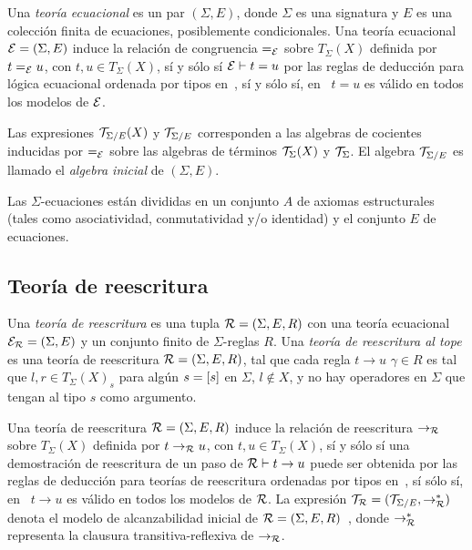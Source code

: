  Una {\em teoría ecuacional} es un par $(\Sigma, E)$, donde $\Sigma$ es
 una signatura y $E$ es una colección finita de ecuaciones, posiblemente
 condicionales.
 Una teoría ecuacional $\mathcal{E}=(\Sigma, E)$ induce la relación de
 congruencia $=_{\mathcal{E}}$ sobre $T_\Sigma(X)$ definida por $t =_{\mathcal{E}} u$, 
 con $t, u \in T_\Sigma(X)$, sí y sólo sí $\mathcal{E} \vdash t=u$ por las
 reglas de deducción para lógica ecuacional ordenada por tipos
 en~\cite{meseguer97}, sí y sólo sí, en~\cite{meseguer97} $t=u$ es válido
 en todos los modelos de $\mathcal{E}$.

 Las expresiones $\mathcal{T}_{\Sigma/E}(X)$ y $\mathcal{T}_{\Sigma/E}$ corresponden
 a las algebras de cocientes inducidas por $=_{\mathcal{E}}$ sobre las algebras de
 términos $\mathcal{T}_\Sigma(X)$ y $\mathcal{T}_\Sigma$.
 El algebra $\mathcal{T}_{\Sigma/E}$ es llamado el {\em algebra inicial} de
 $(\Sigma, E)$.
 
 Las $\Sigma$-ecuaciones están divididas en un conjunto $A$ de axiomas
 estructurales (tales como asociatividad, conmutatividad y/o identidad)
 y el conjunto $E$ de ecuaciones.

 \subsection{Teoría de reescritura}
 \label{tr.prelim}
 
 Una {\em teoría de reescritura} es una tupla $\mathcal{R} = (\Sigma, E, R)$
 con una teoría ecuacional $\mathcal{E}_{\mathcal{R}} = (\Sigma, E)$ y un conjunto
 finito de $\Sigma$-reglas $R$. Una {\em teoría de reescritura al tope}
 es una teoría de reescritura $\mathcal{R} = (\Sigma, E, R)$, tal que cada regla
 $t \rightarrow u$  $\gamma \in R$ es tal que $l, r \in T_{\Sigma}(X)_s$
 para algún $s = [s]$ en $\Sigma$, $l \notin X$, y no hay operadores
 en $\Sigma$ que tengan al tipo $s$ como argumento.

 Una teoría de reescritura $\mathcal{R}=(\Sigma, E, R)$ induce la relación de
 reescritura $\rightarrow_{\mathcal{R}}$ sobre $T_\Sigma(X)$ definida por $t\rightarrow_{\mathcal{R}}u$, 
 con $t, u \in T_\Sigma(X)$, sí y sólo sí una demostración de reescritura
 de un paso de $\mathcal{R} \vdash t \rightarrow u$ puede ser obtenida por las
 reglas de deducción para teorías de reescritura ordenadas por tipos
 en~\cite{bruni06}, sí sólo sí, en~\cite{bruni06} $t \rightarrow u$ es
 válido en todos los modelos de $\mathcal{R}$.
 La expresión $\mathcal{T}_{\mathcal{R}} = (\mathcal{T}_{\Sigma/E},\rightarrow_{\mathcal{R}}^{*})$ denota el
 modelo de alcanzabilidad inicial de $\mathcal{R} = (\Sigma, E, R)$~\cite{bruni06}, donde $\rightarrow_{\mathcal{R}}^{*}$ representa la clausura
transitiva-reflexiva de $\rightarrow_{\mathcal{R}}$.
 

